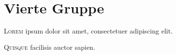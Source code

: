 \chapter{Vierte Gruppe}
\lettrine{L}{orem} ipsum dolor sit amet, consectetuer adipiscing elit. \lipsum*[55]

\lettrine{Q}{uisque} facilisis auctor
sapien. \lipsum*[51]